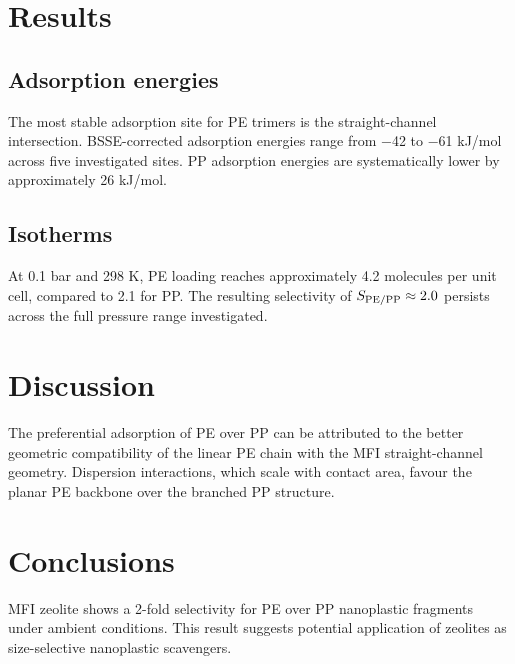 \documentclass[12pt]{article}
\begin{document}
\section{Results}

\subsection{Adsorption energies}
The most stable adsorption site for PE trimers is the straight-channel intersection.
BSSE-corrected adsorption energies range from −42 to −61 kJ/mol across five investigated sites.
PP adsorption energies are systematically lower by approximately 26 kJ/mol.

\subsection{Isotherms}
At 0.1 bar and 298 K, PE loading reaches approximately 4.2 molecules per unit cell,
compared to 2.1 for PP. The resulting selectivity of $S_{\rm PE/PP} \approx 2.0$ persists
across the full pressure range investigated.

\section{Discussion}
The preferential adsorption of PE over PP can be attributed to the better geometric
compatibility of the linear PE chain with the MFI straight-channel geometry. Dispersion
interactions, which scale with contact area, favour the planar PE backbone over the
branched PP structure.

\section{Conclusions}
MFI zeolite shows a 2-fold selectivity for PE over PP nanoplastic fragments under
ambient conditions. This result suggests potential application of zeolites as
size-selective nanoplastic scavengers.
\end{document}
